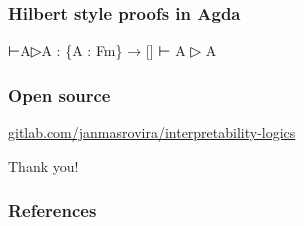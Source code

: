 \documentclass[xcolor={x11names}]{beamer}
\begin{document}
\begin{frame}[fragile]
  \frametitle{Hilbert style proofs in Agda}
\begin{semiverbatim}
⊢A▷A : \{A : Fm\} → [] ⊢ A ▷ A
\end{semiverbatim}
\end{frame}

\begin{frame}
  \frametitle{Open source}
  \centering
  \href{https://gitlab.com/janmasrovira/interpretability-logics}{gitlab.com/janmasrovira/interpretability-logics}
\end{frame}

\begin{frame}
  \centering \Huge Thank you!
\end{frame}

\begin{frame}[allowframebreaks]
  \frametitle{References}
  \nocite{MasRovira:2020:MastersThesis}
  \nocite{joosten2020overview}
  \printbibliography
\end{frame}
\end{document}
